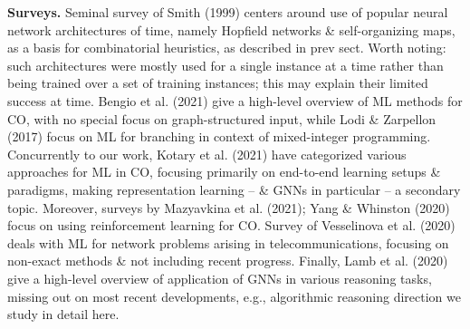 \documentclass{article}
\begin{document}
\begin{itemize}
\begin{itemize}
        {\bf Surveys.} Seminal survey of Smith (1999) centers around use of popular neural network architectures of time, namely Hopfield networks \& self-organizing maps, as a basis for combinatorial heuristics, as described in prev sect. Worth noting: such architectures were mostly used for a single instance at a time rather than being trained over a set of training instances; this may explain their limited success at time. Bengio et al. (2021) give a high-level overview of ML methods for CO, with no special focus on graph-structured input, while Lodi \& Zarpellon (2017) focus on ML for branching in context of mixed-integer programming. Concurrently to our work, Kotary et al. (2021) have categorized various approaches for ML in CO, focusing primarily on end-to-end learning setups \& paradigms, making representation learning -- \& GNNs in particular -- a secondary topic. Moreover, surveys by Mazyavkina et al. (2021); Yang \& Whinston (2020) focus on using reinforcement learning for CO. Survey of Vesselinova et al. (2020) deals with ML for network problems arising in telecommunications, focusing on non-exact methods \& not including recent progress. Finally, Lamb et al. (2020) give a high-level overview of application of GNNs in various reasoning tasks, missing out on most recent developments, e.g., algorithmic reasoning direction we study in detail here.


\end{itemize}
\end{itemize}
\end{document}
